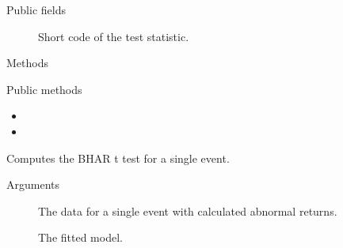 \documentclass[a4paper]{book}
\begin{document}
%
\begin{Section}{Public fields}

\begin{description}

\item[] Short code of the test statistic.

\end{description}


\end{Section}
%
\begin{Section}{Methods}
%
\begin{SubSection}{Public methods}
\begin{itemize}

\item{} 
\item{} 

\end{itemize}

\end{SubSection}




\hypertarget{method-BHARTTest-compute}{}
%
\begin{SubSection}{}
Computes the BHAR t test for a single event.
%

%
\begin{SubSubSection}{Arguments}

\begin{description}

\item[] The data for a single event with
calculated abnormal returns.
\item[] The fitted model.

\end{description}



\end{SubSubSection}

\end{SubSection}





\end{Section}
\end{document}
